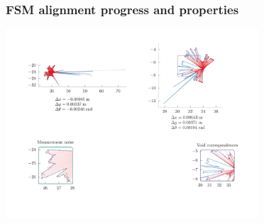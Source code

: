 \begin{frame}[noframenumbering]

  \frametitle{FSM alignment progress and properties}


  \begin{center}
    \includegraphics[height=200pt,width=267pt]{./figures/translation_and_rotation/all_fig13.png}
  \end{center}

\end{frame}
